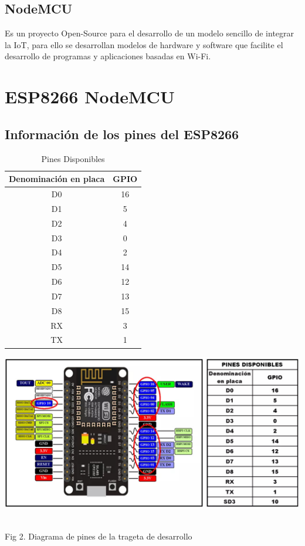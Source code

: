 \documentclass[letterpaper, 10 pt, conference]{ieeeconf}
\begin{document}
\subsection{NodeMCU}

Es un proyecto Open-Source para el desarrollo de un modelo sencillo de integrar la IoT, para ello se desarrollan modelos de hardware y software que facilite el desarrollo de programas y aplicaciones basadas en Wi-Fi.

\section{ESP8266 NodeMCU}

\subsection{Información de los pines del ESP8266}

\begin{table}[h]
\caption{Pines Disponibles}
\begin{center}
\begin{tabular}{|c||c|}
\hline
Denominación en placa & GPIO\\
\hline
D0 & 16\\
\hline
D1 & 5\\
\hline
D2 & 4\\
\hline
D3 & 0\\
\hline
D4 & 2\\
\hline
D5 & 14\\
\hline
D6 & 12\\
\hline
D7 & 13\\
\hline
D8 & 15\\
\hline
RX & 3\\
\hline
TX & 1\\
\hline
\end{tabular}
\end{center}
\end{table}

\begin{center}
\includegraphics[scale=0.5]{Figura2.PNG}
\begin{scriptsize}\\ 
Fig 2. Diagrama de pines de la trageta de desarrollo
\end{scriptsize}
\end{center}
\end{document}
